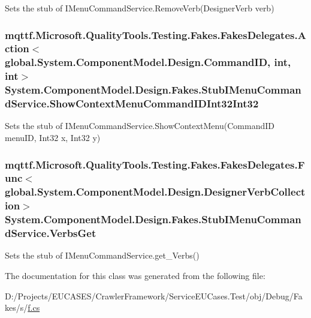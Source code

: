 Sets the stub of I\-Menu\-Command\-Service.\-Remove\-Verb(\-Designer\-Verb verb)

\hypertarget{class_system_1_1_component_model_1_1_design_1_1_fakes_1_1_stub_i_menu_command_service_a0d82df71b1fd03395ad327988f1ecf82}{
\subsubsection[{Show\-Context\-Menu\-Command\-I\-D\-Int32\-Int32}]{\setlength{\rightskip}{0pt plus 5cm}mqttf.\-Microsoft.\-Quality\-Tools.\-Testing.\-Fakes.\-Fakes\-Delegates.\-Action$<$global.\-System.\-Component\-Model.\-Design.\-Command\-I\-D, int, int$>$ System.\-Component\-Model.\-Design.\-Fakes.\-Stub\-I\-Menu\-Command\-Service.\-Show\-Context\-Menu\-Command\-I\-D\-Int32\-Int32}}\label{class_system_1_1_component_model_1_1_design_1_1_fakes_1_1_stub_i_menu_command_service_a0d82df71b1fd03395ad327988f1ecf82}


Sets the stub of I\-Menu\-Command\-Service.\-Show\-Context\-Menu(\-Command\-I\-D menu\-I\-D, Int32 x, Int32 y)

\hypertarget{class_system_1_1_component_model_1_1_design_1_1_fakes_1_1_stub_i_menu_command_service_a6c2ce2e613039494514cb935ee42f5dd}{
\subsubsection[{Verbs\-Get}]{\setlength{\rightskip}{0pt plus 5cm}mqttf.\-Microsoft.\-Quality\-Tools.\-Testing.\-Fakes.\-Fakes\-Delegates.\-Func$<$global.\-System.\-Component\-Model.\-Design.\-Designer\-Verb\-Collection$>$ System.\-Component\-Model.\-Design.\-Fakes.\-Stub\-I\-Menu\-Command\-Service.\-Verbs\-Get}}\label{class_system_1_1_component_model_1_1_design_1_1_fakes_1_1_stub_i_menu_command_service_a6c2ce2e613039494514cb935ee42f5dd}


Sets the stub of I\-Menu\-Command\-Service.\-get\-\_\-\-Verbs()



The documentation for this class was generated from the following file\-:\begin{DoxyCompactItemize}
\item 
D\-:/\-Projects/\-E\-U\-C\-A\-S\-E\-S/\-Crawler\-Framework/\-Service\-E\-U\-Cases.\-Test/obj/\-Debug/\-Fakes/s/\hyperlink{s_2f_8cs}{f.\-cs}\end{DoxyCompactItemize}
